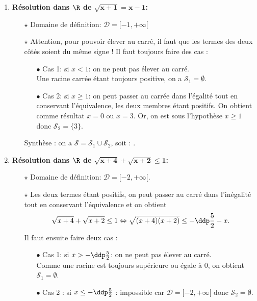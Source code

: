 

\begin{correction} 
\begin{enumerate}
\item \textbf{R\'esolution dans $\mathbf{\R}$ de $\mathbf{\sqrt{x+1}=x-1}$:}\\
\begin{itemize}
\item[$\star$] Domaine de d\'efinition: $\mathcal{D}=\lbrack -1,+\infty\lbrack$
\item[$\star$] Attention, pour pouvoir \'elever au carr\'e, il faut que les termes des deux c\^ot\'es soient du m\^eme signe ! Il faut toujours faire des cas :
\begin{itemize}
\item[$\bullet$] Cas 1: si $x<1$: on ne peut pas \'elever au carr\'e.\\
\noindent Une racine carr\'ee \'etant toujours positive, on a $\mathcal{S}_1=\emptyset$.
\item[$\bullet$] Cas 2: si $x\geq 1$: on peut passer au carr\'ee dans l'\'egalit\'e tout en conservant l'\'equivalence, les deux membres \'etant positifs. On obtient comme r\'esultat $x=0$ ou $x=3$. Or, on est sous l'hypoth\`ese $x\geq 1$ donc $\mathcal{S}_2=\lbrace 3 \rbrace$.
\end{itemize}
Synth\`ese : on a $\mathcal{S} = \mathcal{S}_1 \cup \mathcal{S}_2$, soit : .
\end{itemize} 
\item \textbf{R\'esolution dans $\mathbf{\R}$ de $\mathbf{\sqrt{x+4}+\sqrt{x+2}\leq 1}$:}\\
\noindent \begin{itemize}
\item[$\star$] Domaine de d\'efinition: $\mathcal{D}=\lbrack -2,+\infty\lbrack$.
\item[$\star$] Les deux termes \'etant positifs, on peut passer au carr\'e dans l'in\'egalit\'e tout en conservant l'\'equivalence et on obtient 
$$\sqrt{x+4}+\sqrt{x+2}\leq 1 \Leftrightarrow \sqrt{(x+4)(x+2)}\leq -\ddp\frac{5}{2}-x.$$
Il faut ensuite faire deux cas :
\begin{itemize}
\item[$\bullet$] Cas 1: si $x>-\ddp\frac{5}{2}$: on ne peut pas \'elever au carr\'e.\\
Comme une racine est toujours sup\'erieure ou \'egale \`a 0, on obtient $\mathcal{S}_1=\emptyset$.
\item[$\bullet$] Cas 2 : si $x\leq -\ddp\frac{5}{2}$ : impossible car $\mathcal{D}=\lbrack -2,+\infty\lbrack$ donc $\mathcal{S}_2=\emptyset$.

\end{itemize}
\end{itemize}
\end{enumerate}
\end{correction}
